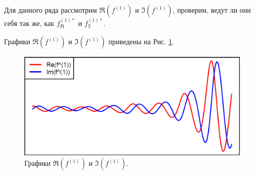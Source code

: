 \documentclass[specialist,
               substylefile = spbu.rtx,
               subf,href,colorlinks=true, 12pt]{disser}
\begin{document}
%
%
%
%
%

Для данного ряда рассмотрим $\Re(f^{(1)})$ и $\Im(f^{(1)})$, проверим, ведут ли они себя так же, как $f^{(1)*}_{\Re}$ и $f^{(1)*}_{\Im}$.

Графики $\Re(f^{(1)})$ и $\Im(f^{(1)})$ приведены на Рис. \ref{f1}.

\begin{figure}[H]
	\begin{center}
		\includegraphics[width=0.67\linewidth]{f1.png}
		\caption{Графики $\Re(f^{(1)})$ и $\Im(f^{(1)})$.}
		\label{f1}
	\end{center}
\end{figure}
\end{document}
